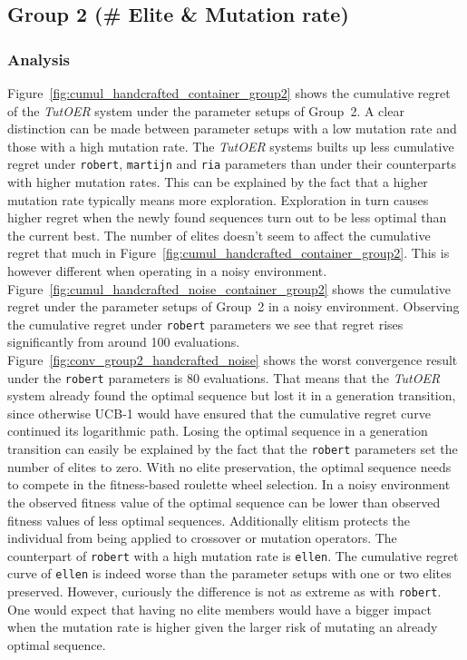 
\subsection{Group 2 (\# Elite \& Mutation rate)}
\label{sec:simulation_handcrafted_group2}
\subsubsection*{Analysis}
Figure~\ref{fig:cumul_handcrafted_container_group2} shows the cumulative regret
of the \emph{TutOER} system under the parameter setups of Group~2. A clear
distinction can be made between parameter setups with a low mutation rate and those
with a high mutation rate. The \emph{TutOER} systems builts up less cumulative
regret under \texttt{robert}, \texttt{martijn} and \texttt{ria} parameters than
under their counterparts with higher mutation rates. This can be explained by
the fact that a higher mutation rate typically means more exploration.
Exploration in turn causes higher regret when the newly found sequences turn out to be
less optimal than the current best. The number of elites doesn't seem to affect
the cumulative regret that much in
Figure~\ref{fig:cumul_handcrafted_container_group2}. This is however different
when operating in a noisy environment.
Figure~\ref{fig:cumul_handcrafted_noise_container_group2} shows the cumulative
regret under the parameter setups of Group~2 in a noisy environment. Observing
the cumulative regret under \texttt{robert} parameters we see that regret rises
significantly from around 100 evaluations.
Figure~\ref{fig:conv_group2_handcrafted_noise} shows the worst convergence result
under the \texttt{robert} parameters is 80 evaluations. That means that the
\emph{TutOER} system already found the optimal sequence but lost it in a
generation transition, since otherwise UCB-1 would have ensured that the
cumulative regret curve continued its logarithmic path. Losing the optimal
sequence in a generation transition can easily be explained by the fact that
the \texttt{robert} parameters set the number of elites to zero. With no elite
preservation, the optimal sequence needs to compete in the fitness-based
roulette wheel selection. In a noisy environment the observed fitness value of
the optimal sequence can be lower than observed fitness values of less optimal
sequences. Additionally elitism protects the individual from being applied to
crossover or mutation operators. The counterpart of \texttt{robert} with a high
mutation rate is \texttt{ellen}. The cumulative regret curve of \texttt{ellen}
is indeed worse than the parameter setups with one or two elites preserved.
However, curiously the difference is not as extreme as with \texttt{robert}.
One would expect that having no elite members would have a bigger impact when
the mutation rate is higher given the larger risk of mutating an already
optimal sequence.

